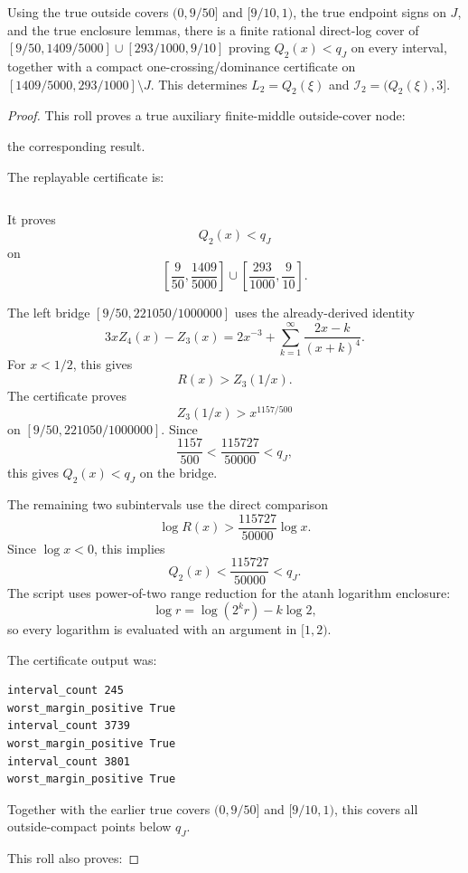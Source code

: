 \begin{proposition}
\label{res:q2-remaining-finite-middle-log-cover-terminal-certificate}
Using the true outside covers \((0,9/50]\) and \([9/10,1)\), the true endpoint signs on \(J\), and the true enclosure lemmas, there is a finite rational direct-log cover of \([9/50,1409/5000]\cup[293/1000,9/10]\) proving \(Q_2(x)<q_J\) on every interval, together with a compact one-crossing/dominance certificate on \([1409/5000,293/1000]\setminus J\). This determines \(L_2=Q_2(\xi)\) and \(\mathcal I_2=(Q_2(\xi),3]\).
\end{proposition}
\begin{proof}
This roll proves a true auxiliary finite-middle outside-cover node:

the corresponding result.

The replayable certificate is:

\begin{verbatim}
\end{verbatim}

It proves
\[
Q_2(x)<q_J
\]
on
\[
\left[\frac9{50},\frac{1409}{5000}\right]
\cup
\left[\frac{293}{1000},\frac9{10}\right].
\]

The left bridge \([9/50,221050/1000000]\) uses the already-derived identity
\[
3xZ_4(x)-Z_3(x)
=2x^{-3}+\sum_{k=1}^{\infty}\frac{2x-k}{(x+k)^4}.
\]
For \(x<1/2\), this gives
\[
R(x)>Z_3(1/x).
\]
The certificate proves
\[
Z_3(1/x)>x^{1157/500}
\]
on \([9/50,221050/1000000]\). Since
\[
\frac{1157}{500}<\frac{115727}{50000}<q_J,
\]
this gives \(Q_2(x)<q_J\) on the bridge.

The remaining two subintervals use the direct comparison
\[
\log R(x)>\frac{115727}{50000}\log x.
\]
Since \(\log x<0\), this implies
\[
Q_2(x)<\frac{115727}{50000}<q_J.
\]
The script uses power-of-two range reduction for the atanh logarithm enclosure:
\[
\log r=\log(2^k r)-k\log 2,
\]
so every logarithm is evaluated with an argument in \([1,2)\).

The certificate output was:

\begin{verbatim}
interval_count 245
worst_margin_positive True
interval_count 3739
worst_margin_positive True
interval_count 3801
worst_margin_positive True
\end{verbatim}

Together with the earlier true covers \((0,9/50]\) and \([9/10,1)\), this covers all outside-compact points below \(q_J\).

This roll also proves:


\end{proof}
